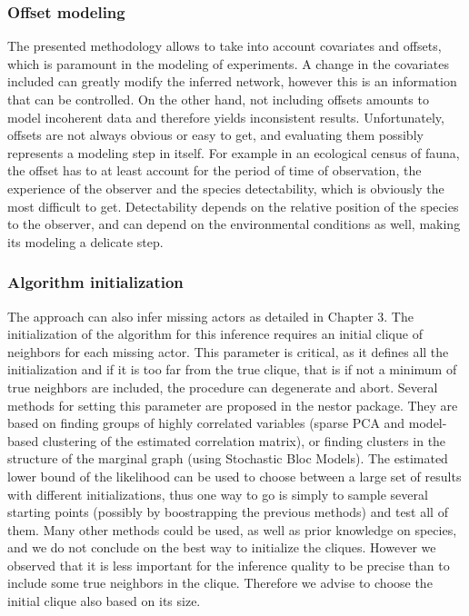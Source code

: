 \subsubsection*{Offset modeling}
The presented methodology allows to take into account covariates and offsets, which is paramount in the modeling of experiments. A change in the covariates included can greatly modify the inferred network, however this is an information that can be controlled. On the other hand, not including offsets amounts to model incoherent data and therefore yields inconsistent results. Unfortunately, offsets are not always obvious or easy to get, and evaluating them possibly represents a modeling step in itself. For example in an ecological census of fauna, the offset has to at least account for the period of time of observation, the experience of the observer and the species detectability, which is obviously the most difficult to get. Detectability depends on the relative position of the species to the observer, and can depend on the environmental conditions as well, making its modeling a delicate step.\\

\subsubsection*{Algorithm initialization}
The approach can also infer missing actors as detailed in Chapter 3. The initialization of the algorithm for this inference requires an initial clique of neighbors for each missing actor. This parameter is critical, as it defines all the initialization and if it is too far from the true clique, that is if not a minimum of true neighbors are included, the procedure can degenerate and abort. Several methods for setting this parameter are proposed in the nestor package. They are based on finding groups of highly correlated variables (sparse PCA and model-based clustering of the estimated correlation matrix), or finding clusters in the structure of the marginal graph (using Stochastic Bloc Models). The estimated lower bound of the likelihood can be used to choose between a large set of results with different initializations, thus one way to go is simply to sample several starting points (possibly by boostrapping the previous methods) and test all of them. Many other methods could be used, as well as prior knowledge on species, and we do not conclude on the best way to initialize the cliques. However we observed that it is less important for the inference quality to be precise than to include some true neighbors in the clique. Therefore we advise to choose the initial clique also based on its size.\\

